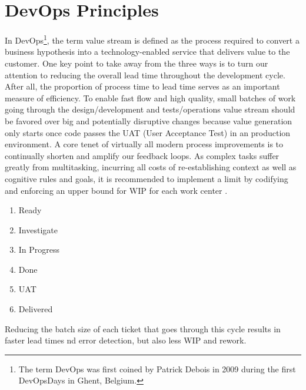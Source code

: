 \section{DevOps Principles}

In DevOps\footnote{The term DevOps was first coined by Patrick Debois in 2009 during
the first DevOpsDays in Ghent, Belgium.}, the term value stream is defined as the
process required to convert a business hypothesis into a technology-enabled service
that delivers value to the customer. One key point to take away from the three ways
is to turn our attention to reducing the overall lead time throughout the development
cycle. After all, the proportion of process time to lead time serves as an important
measure of efficiency. To enable fast flow and high quality, small batches of work
going through the design/development and tests/operations value stream should be
favored over big and potentially disruptive changes because value generation only
starts once code passes the UAT (User Acceptance Test) in an production environment.
A core tenet of virtually all modern process improvements is to continually shorten
and amplify our feedback loops. As complex tasks suffer greatly from multitasking,
incurring all costs of re-establishing context as well as cognitive rules and goals,
it is recommended to implement a limit by codifying and enforcing an upper bound
for WIP for each work center \autocite{devops2016}.

\begin{enumerate}
    \item Ready
    \item Investigate
    \item In Progress
    \item Done
    \item UAT
    \item Delivered
\end{enumerate}

Reducing the batch size of each ticket that goes through this cycle results in
faster lead times nd error detection, but also less WIP and rework.

